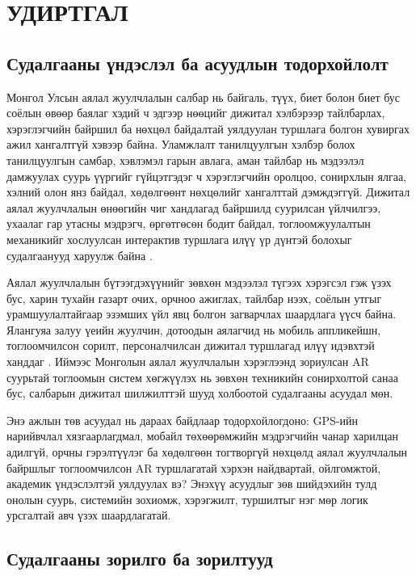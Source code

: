 \chapter{УДИРТГАЛ}
\begin{sloppy}

\section{Судалгааны үндэслэл ба асуудлын тодорхойлолт}

Монгол Улсын аялал жуулчлалын салбар нь байгаль, түүх, биет болон биет бус соёлын өвөөр баялаг хэдий ч эдгээр нөөцийг дижитал хэлбэрээр тайлбарлах, хэрэглэгчийн байршил ба нөхцөл байдалтай уялдуулан туршлага болгон хувиргах ажил хангалтгүй хэвээр байна. Уламжлалт танилцуулгын хэлбэр болох танилцуулгын самбар, хэвлэмэл гарын авлага, аман тайлбар нь мэдээлэл дамжуулах суурь үүргийг гүйцэтгэдэг ч хэрэглэгчийн оролцоо, сонирхлын ялгаа, хэлний олон янз байдал, хөдөлгөөнт нөхцөлийг хангалттай дэмждэггүй. Дижитал аялал жуулчлалын өнөөгийн чиг хандлагад байршилд суурилсан үйлчилгээ, ухаалаг гар утасны мэдрэгч, өргөтгөсөн бодит байдал, тоглоомжуулалтын механикийг хослуулсан интерактив туршлага илүү үр дүнтэй болохыг судалгаанууд харуулж байна \cite{Dias2021MobileTourism,Yovcheva2014AugmentedTourism,Xu2017GamificationTourism}.

Аялал жуулчлалын бүтээгдэхүүнийг зөвхөн мэдээлэл түгээх хэрэгсэл гэж үзэх бус, харин тухайн газарт очих, орчноо ажиглах, тайлбар нээх, соёлын утгыг урамшуулалтайгаар эзэмших үйл явц болгон загварчлах шаардлага үүсч байна. Ялангуяа залуу үеийн жуулчин, дотоодын аялагчид нь мобиль аппликейшн, тоглоомчилсон сорилт, персоналчилсан дижитал туршлагад илүү идэвхтэй ханддаг \cite{Jo2025ARGamification,Thinnukool2025LannaPassport}. Иймээс Монголын аялал жуулчлалын хэрэглээнд зориулсан AR суурьтай тоглоомын систем хөгжүүлэх нь зөвхөн техникийн сонирхолтой санаа бус, салбарын дижитал шилжилттэй шууд холбоотой судалгааны асуудал мөн.

Энэ ажлын төв асуудал нь дараах байдлаар тодорхойлогдоно: GPS-ийн нарийвчлал хязгаарлагдмал, мобайл төхөөрөмжийн мэдрэгчийн чанар харилцан адилгүй, орчны гэрэлтүүлэг ба хөдөлгөөн тогтворгүй нөхцөлд аялал жуулчлалын байршлыг тоглоомчилсон AR туршлагатай хэрхэн найдвартай, ойлгомжтой, академик үндэслэлтэй уялдуулах вэ? Энэхүү асуудлыг зөв шийдэхийн тулд онолын суурь, системийн зохиомж, хэрэгжилт, туршилтыг нэг мөр логик урсгалтай авч үзэх шаардлагатай.

\section{Судалгааны зорилго ба зорилтууд}


\end{sloppy}
